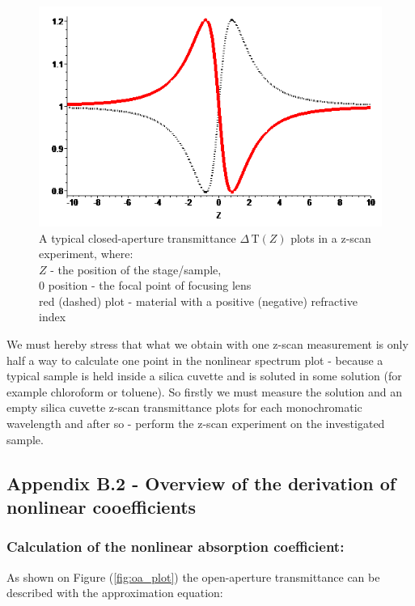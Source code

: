 \documentclass[12pt,twoside,a4paper]{article}
\numberwithin{equation}{subsection}
\numberwithin{figure}{subsection}
\begin{document}
\begin{figure}
  \includegraphics{img/ca_plot.png}
  \caption{A typical closed-aperture transmittance $\Delta \,\mathrm{T}(Z)$ plots in a z-scan experiment, where: \\  
    $Z$ - the position of the stage/sample, \\
    $0$ position - the focal point of focusing lens \\
    red (dashed) plot - material with a positive (negative) refractive index
    \label{fig:ca_plot}}
\end{figure}

We must hereby stress that what we obtain with one z-scan measurement is only half a way to calculate one point in the nonlinear spectrum plot - because a typical sample is held inside a silica cuvette and is soluted in some solution (for example chloroform or toluene). So firstly we must measure the solution and an empty silica cuvette z-scan transmittance plots for each monochromatic wavelength and after so - perform the z-scan experiment on the investigated sample. 

\subsection*{Appendix B.2 - Overview of the derivation of nonlinear cooefficients} \label{chap:zscan_derivation}

\subsubsection*{Calculation of the nonlinear absorption coefficient:}

As shown on Figure (\ref{fig:oa_plot}) the open-aperture transmittance can be described with the approximation equation:
\end{document}
